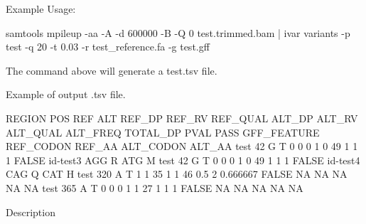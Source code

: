 Example Usage\+: 
\begin{DoxyCode}
samtools mpileup -aa -A -d 600000 -B -Q 0 test.trimmed.bam | ivar variants -p test -q 20 -t 0.03 -r
       test\_reference.fa -g test.gff
\end{DoxyCode}


The command above will generate a test.\+tsv file.

Example of output .tsv file.


\begin{DoxyCode}
REGION  POS REF ALT REF\_DP  REF\_RV  REF\_QUAL    ALT\_DP  ALT\_RV  ALT\_QUAL    ALT\_FREQ    TOTAL\_DP    PVAL   
       PASS    GFF\_FEATURE REF\_CODON   REF\_AA  ALT\_CODON   ALT\_AA
test    42  G   T   0   0   0   1   0   49  1   1   1   FALSE   id-test3    AGG R   ATG M
test    42  G   T   0   0   0   1   0   49  1   1   1   FALSE   id-test4    CAG Q   CAT H
test    320 A   T   1   1   35  1   1   46  0.5 2   0.666667    FALSE   NA  NA  NA  NA  NA
test    365 A   T   0   0   0   1   1   27  1   1   1   FALSE   NA  NA  NA  NA  NA
\end{DoxyCode}


Description

